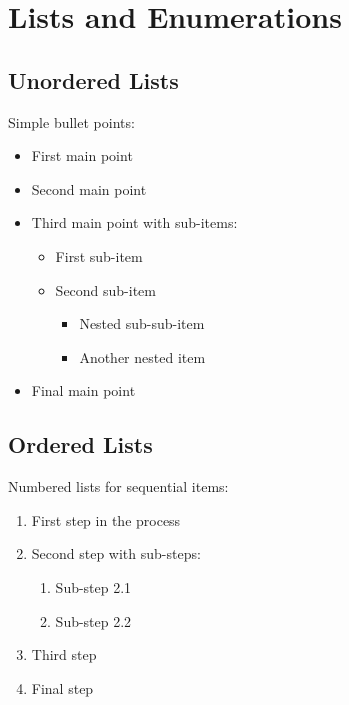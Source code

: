 \section{Lists and Enumerations}
\label{sec:lists}

\subsection{Unordered Lists}
\label{subsec:unordered_lists}

Simple bullet points:

\begin{itemize}
	\item First main point
	\item Second main point
	\item Third main point with sub-items:
	      \begin{itemize}
		      \item First sub-item
		      \item Second sub-item
		            \begin{itemize}
			            \item Nested sub-sub-item
			            \item Another nested item
		            \end{itemize}
	      \end{itemize}
	\item Final main point
\end{itemize}

\subsection{Ordered Lists}
\label{subsec:ordered_lists}

Numbered lists for sequential items:

\begin{enumerate}
	\item First step in the process
	\item Second step with sub-steps:
	      \begin{enumerate}
		      \item Sub-step 2.1
		      \item Sub-step 2.2
	      \end{enumerate}
	\item Third step
	\item Final step
\end{enumerate}

